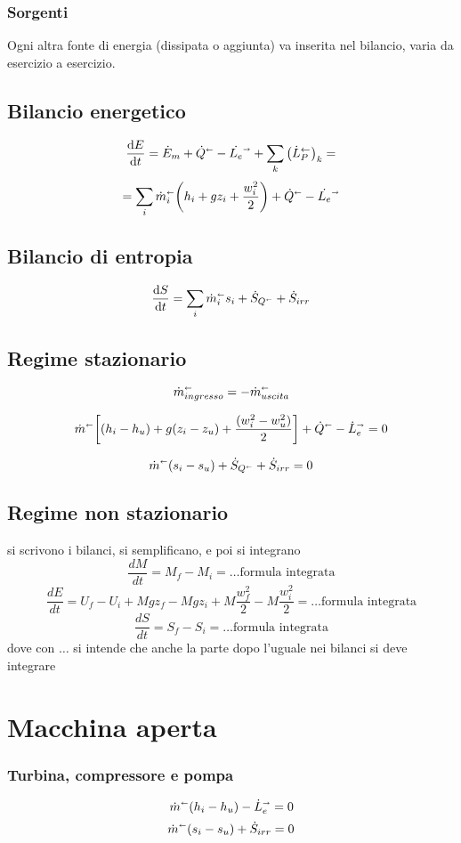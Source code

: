 \subsubsection{Sorgenti}
Ogni altra fonte di energia (dissipata o aggiunta) va inserita nel bilancio, varia da esercizio a esercizio.

\subsection{Bilancio energetico}
\[ \dv{E}{t} = \dot{E}_m + \dot{Q}^\shortleftarrow - \dot{L_e}^\shortrightarrow + \sum_{k} \left(\dot{L}_P^{\leftarrow }\right)_ k = \]
\[= \sum_i \dot{m}_i^\shortleftarrow \qty(h_i + gz_i + \frac{w_i^2}{2}) + \dot{Q}^\shortleftarrow - \dot{L_e}^\shortrightarrow\]

\subsection{Bilancio di entropia}
\[ \dv{S}{t} = \sum_i \dot{m}_i^\shortleftarrow s_i + \dot{S}_{Q^\shortleftarrow} + \dot{S}_{irr} \]

\subsection{Regime stazionario}
\[ \dot{m}_{ingresso}^\shortleftarrow = -\dot{m}_{uscita}^\shortleftarrow \]

\[ \dot{m}^\shortleftarrow\qty[(h_i - h_u) + g(z_i-z_u) + \frac{(w_i^2-w_u^2)}{2}] + \dot{Q}^\shortleftarrow - \dot{L}_e^\shortrightarrow = 0 \]

\[ \dot{m}^\shortleftarrow (s_i - s_u) + \dot{S}_{Q^\shortleftarrow} + \dot{S}_{irr} = 0 \]

\subsection{Regime non stazionario}
si scrivono i bilanci, si semplificano, e poi si integrano
\[
    \frac{dM}{dt} = M_f - M_i = \dots \text{formula integrata}
\]
\[
    \frac{dE}{dt} = U_f - U_i + Mgz_f - Mgz_i + M \frac{w_f^2}{2} - M \frac{w_i^2}{2}= \dots \text{formula integrata}
\]
\[
    \frac{dS}{dt} = S_f - S_i = \dots \text{formula integrata}
\]
dove con $\dots$ si intende che anche la parte dopo l'uguale nei bilanci si deve integrare

\section{Macchina aperta}
\subsubsection{Turbina, compressore e pompa}
\[ \dot{m}^\shortleftarrow (h_i - h_u) - \dot{L}_e^\shortrightarrow = 0 \]
\[ \dot{m}^\shortleftarrow (s_i - s_u) + \dot{S}_{irr} = 0 \]


